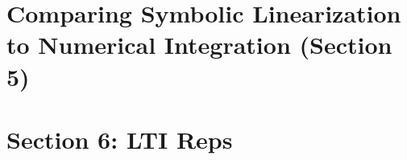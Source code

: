 \documentclass[10pt]{article}
\begin{document}
\section{Comparing Symbolic Linearization to Numerical Integration (Section 5)}

\section{Section 6: LTI Reps}
\end{document}
